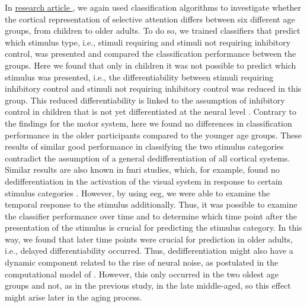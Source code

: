 In \hyperref[results:paperII]{research article }, we again used classification algorithms to investigate whether the cortical representation of selective attention differs between six different age groups, from children to older adults. To do so, we trained classifiers that predict which stimulus type, i.e., stimuli requiring and stimuli not requiring inhibitory control, was presented and compared the classification performance between the groups. Here we found that only in children it was not possible to predict which stimulus was presented, i.e., the differentiability between stimuli requiring inhibitory control and stimuli not requiring inhibitory control was reduced in this group. This reduced differentiability is linked to the assumption of inhibitory control in children that is not yet differentiated at the neural level \cite{Waszak2010, Reuter2019}. Contrary to the findings for the motor system, here we found no differences in classification performance in the older participants compared to the younger age groups. These results of similar good performance in classifying the two stimulus categories contradict the assumption of a general dedifferentiation of all cortical systems. Similar results are also known in \gls{fmri} studies, which, for example, found no dedifferentiation in the activation of the visual system in response to certain stimulus categories \cite{Voss2008}. However, by using \gls{eeg}, we were able to examine the temporal response to the stimulus additionally. Thus, it was possible to examine the classifier performance over time and to determine which time point after the presentation of the stimulus is crucial for predicting the stimulus category. In this way, we found that later time points were crucial for prediction in older adults, i.e., delayed differentiability occurred. Thus, dedifferentiation might also have a dynamic component related to the rise of neural noise, as postulated in the computational model of \citeauthor{Li2001} \cite{Li2001, Li2000}. However, this only occurred in the two oldest age groups and not, as in the previous study, in the late middle-aged, so this effect might arise later in the aging process.

